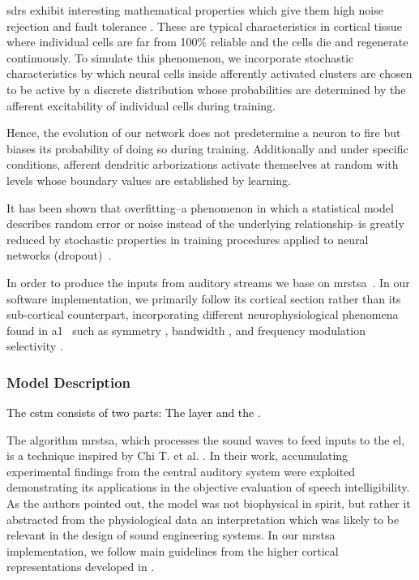 \documentclass[10pt,letterpaper]{article}
\newcommand{\reviewertwo}[1]{\textcolor{black}{#1}}
\begin{document}
\glspl{sdr} exhibit interesting mathematical properties which give them high noise rejection and fault tolerance \cite{ahmad_2015}.
These are typical characteristics in cortical tissue where individual cells are far from 100\% reliable and the cells die and regenerate continuously. To simulate this phenomenon, we incorporate stochastic characteristics by which neural cells inside afferently activated clusters are chosen to be active by a discrete distribution whose probabilities are determined by the afferent excitability of individual cells during training.

Hence, the evolution of our network does not predetermine a neuron to fire but biases its probability of doing so during training. Additionally and under specific conditions, afferent dendritic arborizations activate themselves at random with levels whose boundary values are established by learning. 

It has been shown that overfitting--a phenomenon in which a statistical model describes random error or noise instead of the underlying relationship--is greatly reduced by stochastic properties in training procedures applied to neural networks (dropout)~\cite{JMLR:v15:srivastava14a}.

In order to produce the inputs from auditory streams we base on \gls{mrstsa}~\cite{chi_2005}. In our software implementation, we primarily follow its cortical section rather than its sub-cortical counterpart, incorporating different neurophysiological phenomena found in \gls{a1}~\cite{wang_1995} such as symmetry \cite{shamma_1993}, bandwidth \cite{schreiner_1990}, and frequency modulation selectivity \cite{shamma_1993,heil_1992,mendelson_1985}.








\subsubsection*{Model Description}
\label{model-description}

\reviewertwo{The \gls{cstm} consists of two parts: The \glsfirst{mrstsa} layer and the \glsfirst{el}}.

The algorithm \gls{mrstsa}, which processes the sound waves to feed inputs to the \gls{el}, is a technique inspired by Chi T. et al. \cite{chi_2005}. In their work, accumulating experimental findings from the central auditory system were exploited demonstrating its applications in the objective evaluation of speech intelligibility. As the authors pointed out, the model was not biophysical in spirit, but rather it abstracted from the physiological data an interpretation which was likely to be relevant in the design of sound engineering systems. In our \gls{mrstsa} implementation, we follow main guidelines from the higher cortical representations developed in \cite{chi_2005}.
\end{document}
